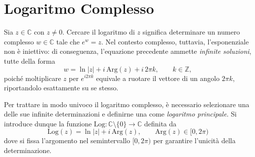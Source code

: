 \section{Logaritmo Complesso}
Sia \(z \in \mathbb{C}\) con \(z \neq 0\). Cercare il logaritmo di \(z\) significa
determinare un numero complesso \(w \in \mathbb{C}\) tale che $e^{w} = z$. Nel contesto complesso, tuttavia, l’esponenziale non è iniettivo: di conseguenza,
l’equazione precedente ammette \emph{infinite soluzioni}, tutte della forma
\[
w = \ln|z| + i\,\text{Arg}(z) + i\,2\pi k, \qquad k \in \mathbb{Z},
\]
poiché moltiplicare \(z\) per \(e^{i2\pi k}\) equivale a ruotare il vettore di un angolo
\(2\pi k\), riportandolo esattamente su se stesso.

\begin{figure}[H]
    \centering
\end{figure}

Per trattare in modo univoco il logaritmo complesso, è necessario selezionare
una delle sue infinite determinazioni e definirne una come \emph{logaritmo principale}.
Si introduce dunque la funzione
\(
\text{Log} : \mathbb{C}\setminus\{0\} \longrightarrow \mathbb{C}
\)
definita da
\[
\text{Log}(z) = \ln|z| + i\,\text{Arg}(z),
\qquad \text{Arg}(z) \in [0,2\pi)
\]
dove si fissa l'argomento nel semintervallo \([0,2\pi)\) per garantire
l’unicità della determinazione.

